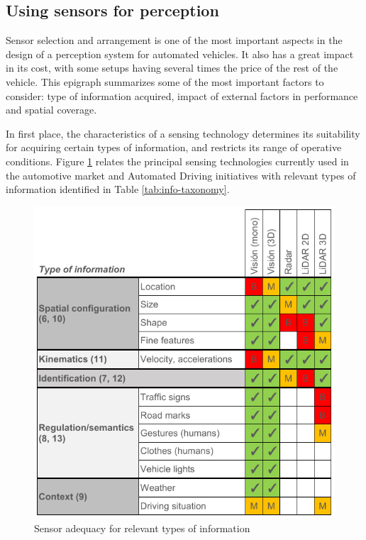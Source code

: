 \subsection{Using sensors for perception}
\label{sec:03-e-sensors-for-perception}

Sensor selection and arrangement is one of the most important aspects in the 
design of a perception system for automated vehicles. It also has a great impact
in its cost, with some setups having several times the price of the rest of 
the vehicle. 
This epigraph summarizes some of the most important factors to consider: type 
of information acquired, impact of external factors in performance and spatial
coverage.

In first place, the characteristics of a sensing technology determines its 
suitability for acquiring certain types of information, and restricts its range 
of operative conditions.
Figure \ref{fig:information_vs_sensors} relates the principal sensing 
technologies currently used in the automotive market and Automated Driving
initiatives with relevant types of information identified in Table 
\ref{tab:info-taxonomy}.

\begin{figure}[h]
    \centering
    \includegraphics[width=0.95\linewidth]{"img/information_types_sensors"}
    \caption{Sensor adequacy for relevant types of information}
    \label{fig:information_vs_sensors}
\end{figure}

